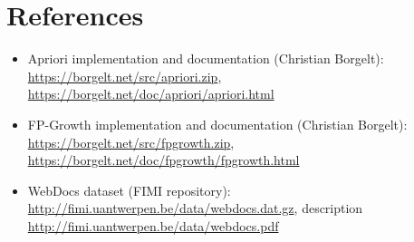 \documentclass[11pt]{article}
\begin{document}
\section{References}

\begin{itemize}
    \item Apriori implementation and documentation (Christian Borgelt): \url{https://borgelt.net/src/apriori.zip}, \url{https://borgelt.net/doc/apriori/apriori.html}
    \item FP-Growth implementation and documentation (Christian Borgelt): \url{https://borgelt.net/src/fpgrowth.zip}, \url{https://borgelt.net/doc/fpgrowth/fpgrowth.html}
    \item WebDocs dataset (FIMI repository): \url{http://fimi.uantwerpen.be/data/webdocs.dat.gz}, description \url{http://fimi.uantwerpen.be/data/webdocs.pdf}
\end{itemize}
\end{document}
